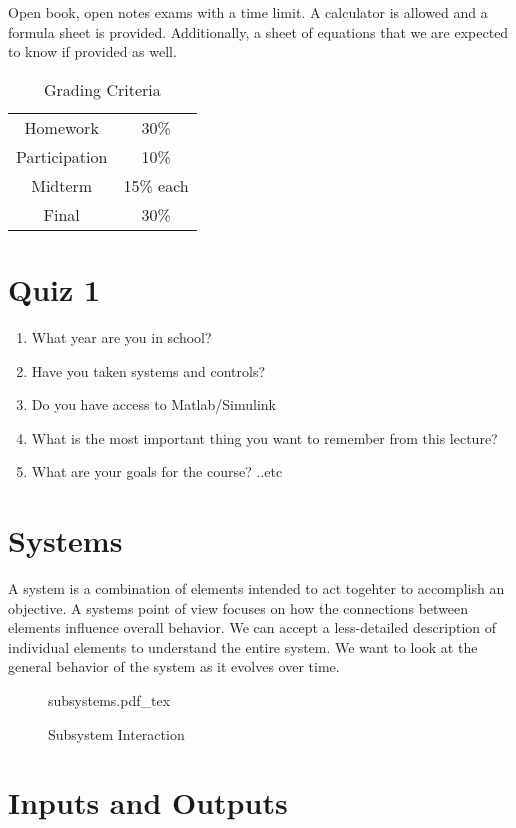 \documentclass[12pt, a4paper]{report}
\newcommand{\incfig}[2][1]{%
    \def\svgwidth{#1\columnwidth}
    {#2.pdf_tex}
}
\begin{document}
  Open book, open notes exams with a time limit. A calculator is allowed and a formula sheet is provided. Additionally, a sheet of equations that we are expected to know if provided as well.

  \begin{table}
    \centering
    \caption{Grading Criteria}
    \label{tab:table1}
    \begin{tabular}{c c}
      Homework & 30\% \\
      Participation & 10\% \\
      Midterm & 15\% each \\
      Final & 30\%
    \end{tabular}
  \end{table}

  \section{Quiz 1}

  \begin{enumerate}
    \item What year are you in school?
    \item Have you taken systems and controls?
    \item Do you have access to Matlab/Simulink
    \item What is the most important thing you want to remember from this lecture?
    \item What are your goals for the course? ..etc
  \end{enumerate}

  \section{Systems}

  A system is a combination of elements intended to act togehter to accomplish an objective. A systems point of view focuses on how the connections between elements influence overall behavior. We can accept a less-detailed description of individual elements to understand the entire system. We want to look at the general behavior of the system as it evolves over time.

  \begin{figure}
    \centering
    \incfig{subsystems}
    \caption{Subsystem Interaction}
  \end{figure}

  \newpage
  \section{Inputs and Outputs}
\end{document}
